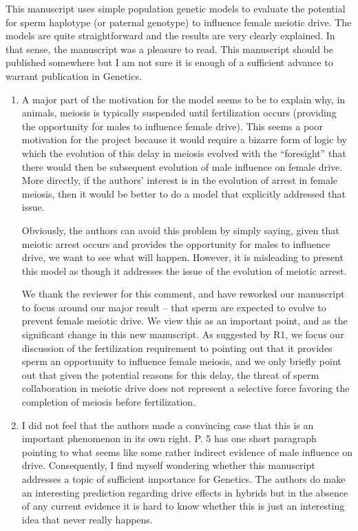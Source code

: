 \documentclass[12pt,letterpaper]{article}
\newcommand{\yb}[1]{{ \color{blue} #1}}
\begin{document}
This manuscript uses simple population genetic models to evaluate the potential
for sperm haplotype (or paternal genotype) to influence female meiotic drive. 
The models are quite straightforward and the results are very clearly explained.
 In that sense, the manuscript was a pleasure to read.  This manuscript should
be published somewhere but I am not sure it is enough of a sufficient advance to
warrant publication in Genetics.
\begin{enumerate}
\item
A major part of the motivation for the model seems to be to explain why, in
animals, meiosis is typically suspended until fertilization occurs (providing
the opportunity for males to influence female drive).  This seems a poor
motivation for the project because it would require a bizarre form of logic by
which the evolution of this delay in meiosis evolved with the ``foresight'' that
there would then be subsequent evolution of male influence on female drive. 
More directly, if the authors' interest is in the evolution of arrest in female
meiosis, then it would be better to do a model that explicitly addressed that
issue.  

Obviously, the authors can avoid this problem by simply saying, given that
meiotic arrest occurs and provides the opportunity for males to influence drive,
we want to see what will happen.  However, it is misleading to present this
model as though it addresses the issue of the evolution of meiotic arrest.

\yb{We thank the reviewer for this comment, and have reworked our manuscript to focus 
	around our major result -- that sperm are expected to evolve to prevent female meiotic drive.
	We view this as an important point, and as the significant change in this new manuscript. 
	As suggested by R1, we focus our discussion of the fertilization requirement to pointing out that it provides sperm an opportunity to influence female meiosis, 
	and we only briefly point out that given the potential reasons for this delay, the threat of sperm collaboration in meiotic drive does not represent a selective force favoring the completion of meiosis before fertilization.}

\item
I did not feel that the authors made a convincing case that this is an
important phenomenon in its own right.  P. 5 has one short paragraph pointing to
what seems like some rather indirect evidence of male influence on drive.
Consequently, I find myself wondering whether this manuscript addresses a topic
of sufficient importance for Genetics.  The authors do make an interesting
prediction regarding drive effects in hybrids but in the absence of any current
evidence it is hard to know whether this is just an interesting idea that never
really happens. 
\end{enumerate}
\end{document}
